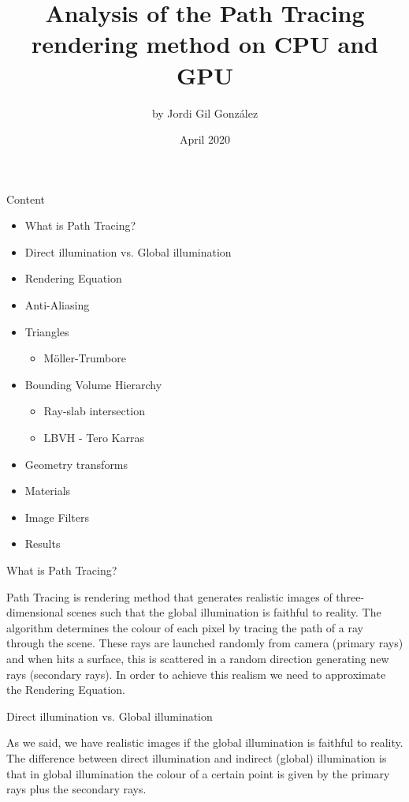 \documentclass{beamer}
\title{Analysis of the Path Tracing rendering method on CPU and GPU}
\author{by Jordi Gil González}
\date{April 2020}
\begin{document}
\maketitle

\begin{frame}{Content}
	\begin{itemize}
		\item What is Path Tracing?
		\item Direct illumination vs. Global illumination
		\item Rendering Equation
		\item Anti-Aliasing
		\item Triangles
		\begin{itemize}
			\item Möller-Trumbore
		\end{itemize}
		\item Bounding Volume Hierarchy
		\begin{itemize}
			\item Ray-slab intersection
			\item LBVH - Tero Karras
		\end{itemize}
		\item Geometry transforms
		\item Materials
		\item Image Filters
		\item Results
	\end{itemize}
\end{frame}

\begin{frame}{What is Path Tracing?}

Path Tracing is rendering method that generates realistic images of three-dimensional scenes such that the global illumination is faithful to reality. The algorithm determines the colour of each pixel by tracing the path of a ray through the scene. These rays are launched randomly from camera (primary rays) and when hits a surface, this is scattered in a random direction generating new rays (secondary rays). In order to achieve this realism we need to approximate the Rendering Equation.

\end{frame}

\begin{frame}{Direct illumination vs. Global illumination}

As we said, we have realistic images if the global illumination is faithful to reality. The difference between direct illumination and indirect (global) illumination is that in global illumination the colour of a certain point is given by the primary rays plus the secondary rays.

\end{frame}
\end{document}
